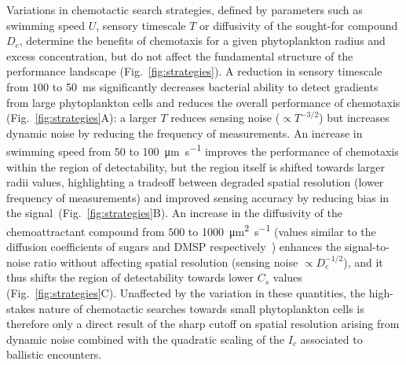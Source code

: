 \documentclass[9pt,twocolumn,twoside]{pnas-new}
\begin{document}
Variations in chemotactic search strategies, defined by parameters such as swimming speed $U$, sensory timescale $T$ or diffusivity of the sought-for compound $D_c$, determine the benefits of chemotaxis for a given phytoplankton radius and excess concentration, but do not affect the fundamental structure of the performance landscape (Fig.~\ref{fig:strategies}).
A reduction in sensory timescale from $100$ to \SI{50}{\milli\s} significantly decreases bacterial ability to detect gradients from large phytoplankton cells and reduces the overall performance of chemotaxis (Fig.~\ref{fig:strategies}A): a larger $T$ reduces sensing noise ($\propto T^{-3/2}$) but increases dynamic noise by reducing the frequency of measurements.
An increase in swimming speed from $50$ to \SI{100}{\micro\m\per\s} improves the performance of chemotaxis within the region of detectability, but the region itself is shifted towards larger radii values, highlighting a tradeoff between degraded spatial resolution (lower frequency of measurements) and improved sensing accuracy by reducing bias in the signal~\cite{hein2016physical}(Fig.~\ref{fig:strategies}B).
An increase in the diffusivity of the chemoattractant compound from $500$ to \SI{1000}{\micro\m^2\per\s} 
(values similar to the diffusion coefficients of sugars and DMSP respectively~\cite{})
enhances the signal-to-noise ratio without affecting spatial resolution (sensing noise $\propto D_c^{-1/2}$), and it thus shifts the region of detectability towards lower $C_s$ values (Fig.~\ref{fig:strategies}C).
Unaffected by the variation in these quantities, the high-stakes nature of chemotactic searches towards small phytoplankton cells is therefore only a direct result of the sharp cutoff on spatial resolution arising from dynamic noise combined with the quadratic scaling of the $I_c$ associated to ballistic encounters.
\end{document}

